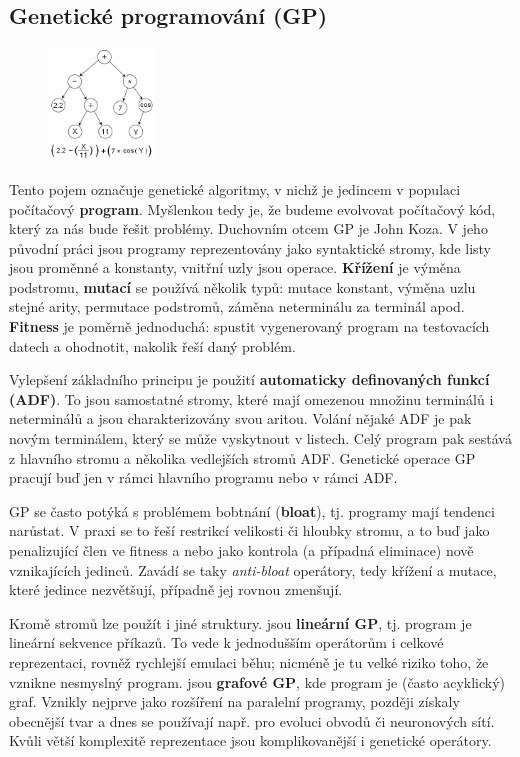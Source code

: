 \subsection{Genetické programování (GP)}
\begin{figure}
\centering
\includegraphics[width=0.25\textwidth]{img/gp.png}
\end{figure}
Tento pojem označuje genetické algoritmy, v nichž je jedincem v populaci počítačový \textbf{program}. Myšlenkou tedy je, že budeme evolvovat počítačový kód, který za nás bude řešit problémy. Duchovním otcem GP je John Koza. V jeho původní práci jsou programy reprezentovány jako syntaktické stromy, kde listy jsou proměnné a konstanty, vnitřní uzly jsou operace. \textbf{Křížení} je výměna podstromu, \textbf{mutací} se používá několik typů: mutace konstant, výměna uzlu stejné arity, permutace podstromů, záměna neterminálu za terminál apod. \textbf{Fitness} je poměrně jednoduchá: spustit vygenerovaný program na testovacích datech a ohodnotit, nakolik řeší daný problém.

Vylepšení základního principu je použití \textbf{automaticky definovaných funkcí (ADF)}. To jsou samostatné stromy, které mají omezenou množinu terminálů i neterminálů a jsou charakterizovány svou aritou. Volání nějaké ADF je pak novým terminálem, který se může vyskytnout v listech. Celý program pak sestává z hlavního stromu a několika vedlejších stromů ADF. Genetické operace GP pracují buď jen v rámci hlavního programu nebo v rámci ADF.

GP se často potýká s problémem bobtnání (\textbf{bloat}), tj. programy mají tendenci narůstat. V praxi se to řeší restrikcí velikosti či hloubky stromu, a to buď jako penalizující člen ve fitness a nebo jako kontrola (a případná eliminace) nově vznikajících jedinců. Zavádí se taky \textit{anti-bloat} operátory, tedy křížení a mutace, které jedince nezvětšují, případně jej rovnou zmenšují.

Kromě stromů lze použít i jiné struktury.  jsou \textbf{lineární GP}, tj. program je lineární sekvence příkazů. To vede k jednodušším operátorům i celkové reprezentaci, rovněž rychlejší emulaci běhu; nicméně je tu velké riziko toho, že vznikne nesmyslný program.  jsou \textbf{grafové GP}, kde program je (často acyklický) graf. Vznikly nejprve jako rozšíření na paralelní programy, později získaly obecnější tvar a dnes se používají např. pro evoluci obvodů či neuronových sítí. Kvůli větší komplexitě reprezentace jsou komplikovanější i genetické operátory.

